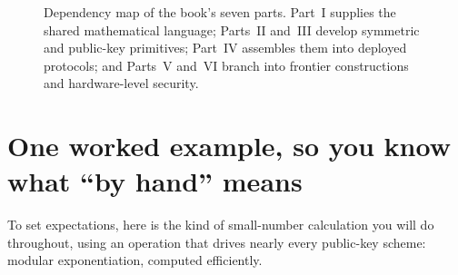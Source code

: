 \begin{figure}[htbp]
\caption{Dependency map of the book's seven parts. Part~I supplies the shared mathematical language; Parts~II and~III develop symmetric and public-key primitives; Part~IV assembles them into deployed protocols; and Parts~V and~VI branch into frontier constructions and hardware-level security.}
\label{fig:preface-roadmap}
\end{figure}

\section*{One worked example, so you know what ``by hand'' means}

To set expectations, here is the kind of small-number calculation you will do throughout, using an operation that drives nearly every public-key scheme: modular exponentiation, computed efficiently.

